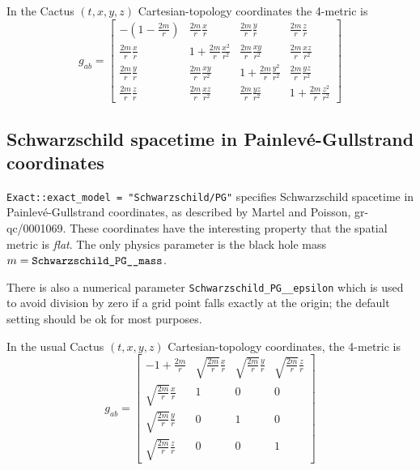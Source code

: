 In the Cactus $(t,x,y,z)$ Cartesian-topology coordinates the 4-metric is
\begin{equation}
g_{ab} = \left[
	 \begin{array}{cccc}
	 - \left( 1 - \frac{2m}{r} \right)
			& \frac{2m}{r} \frac{x}{r}
				& \frac{2m}{r} \frac{y}{r}
					& \frac{2m}{r} \frac{z}{r}	\\
	 \frac{2m}{r} \frac{x}{r}
			& 1 + \frac{2m}{r} \frac{x^2}{r^2}
				& \frac{2m}{r} \frac{xy}{r^2}
					& \frac{2m}{r} \frac{xz}{r^2}	\\
	 \frac{2m}{r} \frac{y}{r}
			& \frac{2m}{r} \frac{xy}{r^2}
				& 1 + \frac{2m}{r} \frac{y^2}{r^2}
					& \frac{2m}{r} \frac{yz}{r^2}	\\
	 \frac{2m}{r} \frac{z}{r}
			& \frac{2m}{r} \frac{xz}{r^2}
				& \frac{2m}{r} \frac{yz}{r^2}
					& 1 + \frac{2m}{r} \frac{z^2}{r^2}
	 \end{array}
	 \right]
\end{equation}


\subsection{Schwarzschild spacetime in Painlev\'{e}-Gullstrand coordinates}

\verb|Exact::exact_model = "Schwarzschild/PG"| specifies Schwarzschild
spacetime in Painlev\'{e}-Gullstrand coordinates, as described by
Martel and Poisson, gr-qc/0001069.  These coordinates have the
interesting property that the spatial metric is {\em flat\/}.
The only physics parameter is the black hole mass
$m = \verb|Schwarzschild_PG__mass|$.

There is also a numerical parameter \verb|Schwarzschild_PG__epsilon|
which is used to avoid division by zero if a grid point falls exactly
at the origin; the default setting should be ok for most purposes.

In the usual Cactus $(t,x,y,z)$ Cartesian-topology coordinates, the
4-metric is
\begin{equation}
g_{ab} = \left[
	 \begin{array}{cccc}
	 -1 + \frac{2m}{r}
		& \sqrt{\frac{2m}{r}} \frac{x}{r}
			& \sqrt{\frac{2m}{r}} \frac{y}{r}
				& \sqrt{\frac{2m}{r}} \frac{z}{r}
									\\
	 \sqrt{\frac{2m}{r}} \frac{x}{r}
		& 1	& 0	& 0					\\
	 \sqrt{\frac{2m}{r}} \frac{y}{r}
		& 0	& 1	& 0					\\
	 \sqrt{\frac{2m}{r}} \frac{z}{r}
		& 0	& 0	& 1					%
	 \end{array}
	 \right]
\end{equation}

